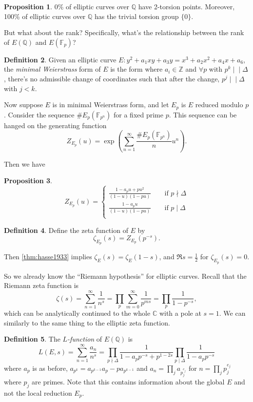 \documentclass{article}
\newcommand{\F}{\mathbb{F}}
\newcommand{\Z}{\mathbb{Z}}
\newcommand{\Q}{\mathbb{Q}}
\newcommand{\C}{\mathbb{C}}
\theoremstyle{definition}
\newtheorem{defn}{Definition}[subsection]
\newtheorem{prop}[defn]{Proposition}
\begin{document}
\begin{prop}
0\% of elliptic curves over $\Q$ have 2-torsion points. Moreover, 100\% of elliptic curves over $\Q$ has the trivial torsion group $\{0\}$.
\end{prop}

But what about the rank? Specifically, what's the relationship between the rank of $E(\Q)$ and $E(\F_p)$?

\begin{defn}
Given an elliptic curve $E:y^2+a_1xy+a_3y=x^3+a_2x^2+a_4x+a_6$, the \textit{minimal Weierstrass} form of $E$ is the form where $a_i\in\Z$ and $\forall p$ with $p^k\mid\!\mid\Delta$, there's no admissible change of coordinates such that after the change, $p^j\mid\!\mid\Delta$ with $j<k$.
\end{defn}

Now suppose $E$ is in minimal Weierstrass form, and let $E_p$ is $E$ reduced modulo $p$. Consider the sequence $\# E_p(\F_{p^n})$ for a fixed prime $p$. This sequence can be hanged on the generating function
\[
Z_{E_p}(u)=\exp\left(\sum_{n=1}^\infty\frac{\# E_p(\F_{p^n})}{n}u^n\right).
\]

Then we have
\begin{prop}
\[
Z_{E_p}(u)=\left\{
\begin{aligned}
\frac{1-a_pu+pu^2}{(1-u)(1-pu)}\qquad\text{if }p\nmid\Delta \\
\frac{1-a_pu}{(1-u)(1-pu)}\qquad\text{if }p\mid\Delta \\
\end{aligned}
\right.
\]
\end{prop}

\begin{defn}
Define the zeta function of $E$ by
\[
\zeta_{E_p}(s)=Z_{E_p}(p^{-s}).
\]
\end{defn}

Then \ref{thm:hasse1933} implies $\zeta_E(s)=\zeta_E(1-s)$, and $\Re s=\frac12$ for $\zeta_{E_p}(s)=0$.

So we already know the ``Riemann hypothesis'' for elliptic curves. Recall that the Riemann zeta function is
\[
\zeta(s)=\sum_{n=1}^\infty\frac{1}{n^s}=\prod_p\sum_{m=0}^\infty\frac{1}{p^{ms}}=\prod_p\frac{1}{1-p^{-s}},
\]
which can be analytically continued to the whole $\C$ with a pole at $s=1$. We can similarly to the same thing to the elliptic zeta function.

\begin{defn}
The $L$\textit{-function} of $E(\Q)$ is
\[
L(E,s)=\sum_{n=1}^\infty\frac{a_n}{n^s}=\prod_{p\nmid\Delta}\frac{1}{1-a_pp^{-s}+p^{1-2s}}\prod_{p\mid\Delta}\frac{1}{1-a_pp^{-s}}
\]
where $a_p$ is as before, $a_{p^k}=a_{p^{k-1}}a_p-pa_{p^{k-1}}$ and $a_n=\prod_j a_{p_j^{e_j}}$ for $n=\prod_jp_j^{e_j}$ where $p_j$ are primes. Note that this contains information about the global $E$ and not the local reduction $E_p$.
\end{defn}
\end{document}

